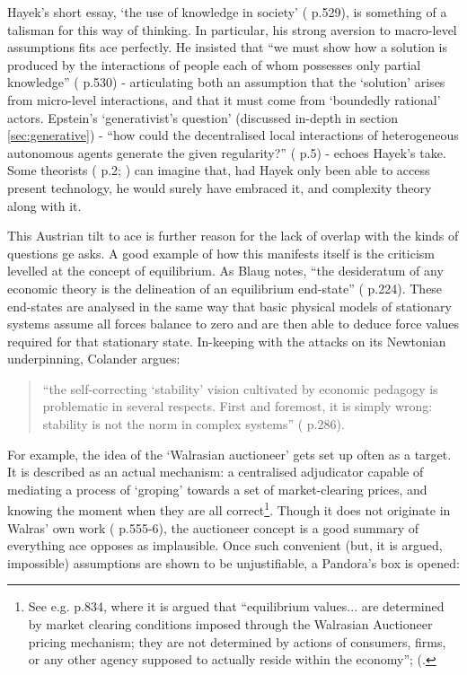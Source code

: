 Hayek's short essay, `the use of knowledge in society' (\citealt{hayek_use_1945} p.529), is something of a talisman for this way of thinking. In particular, his strong aversion to macro-level assumptions fits \gls{ace} perfectly. He insisted that ``we must show how a solution is produced by the interactions of people each of whom possesses only partial knowledge'' (\citealt{hayek_use_1945} p.530) - articulating both an assumption that the `solution' arises from micro-level interactions, and that it must come from `boundedly rational' actors. Epstein's `generativist's question' (discussed in-depth in section \ref{sec:generative}) -  ``how could the decentralised local interactions of heterogeneous autonomous agents generate the given regularity?'' (\citealt{epstein_generative_2006} p.5) - echoes Hayek's take. Some theorists (\citealt{vriend_was_2002} p.2; \citealt{miller_complex_2007}) can imagine that, had Hayek only been able to access present technology, he would surely have embraced it, and complexity theory along with it.

This Austrian tilt to \gls{ace} is further reason for the lack of overlap with the kinds of questions \gls{ge} asks. A good example of how this manifests itself is the criticism levelled at the concept of equilibrium. As Blaug notes, ``the desideratum of any economic theory is the delineation of an equilibrium end-state'' (\citealt{blaug_trade-off_2009} p.224). These end-states are analysed in the same way that basic physical models of stationary systems assume all forces balance to zero and are then able to deduce force values required for that stationary state. In-keeping with the attacks on its Newtonian underpinning, Colander argues:

\begin{quote}
``the self-correcting `stability' vision cultivated by economic pedagogy is problematic in several respects. First and foremost, it is simply wrong: stability is not the norm in complex systems'' (\citealt{colander_sins_2010} p.286).
\end{quote}

For example, the idea of the `Walrasian auctioneer' gets set up often as a target. It is described as an actual mechanism: a centralised adjudicator capable of mediating a process of `groping' towards a set of market-clearing prices, and knowing the moment when they are all correct\footnote{See e.g. \citealt{tesfatsion_agent-based_2006} p.834, where it is argued that ``equilibrium values... are determined by market clearing conditions imposed through the Walrasian Auctioneer pricing mechanism; they are not determined by actions of consumers, firms, or any other agency supposed to actually reside within the economy''; (\citealt{consiglio_artificial_2007-1}.}. Though it does not originate in Walras' own work (\citealt{blaug_economic_1997} p.555-6), the auctioneer concept is a good summary of everything \gls{ace} opposes as implausible. Once such convenient (but, it is argued, impossible) assumptions are shown to be unjustifiable, a Pandora's box is opened:

